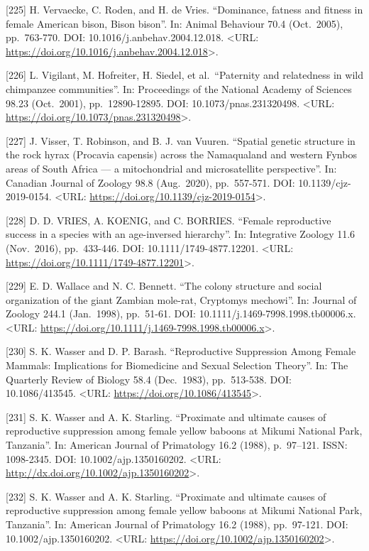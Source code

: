 \documentclass[
]{article}
\begin{document}
{[}225{]} H. Vervaecke, C. Roden, and H. de Vries. ``Dominance, fatness
and fitness in female American bison, Bison bison''. In: Animal
Behaviour 70.4 (Oct.~2005), pp.~763-770. DOI:
10.1016/j.anbehav.2004.12.018. \textless URL:
\url{https://doi.org/10.1016/j.anbehav.2004.12.018}\textgreater.

{[}226{]} L. Vigilant, M. Hofreiter, H. Siedel, et al.~``Paternity and
relatedness in wild chimpanzee communities''. In: Proceedings of the
National Academy of Sciences 98.23 (Oct.~2001), pp.~12890-12895. DOI:
10.1073/pnas.231320498. \textless URL:
\url{https://doi.org/10.1073/pnas.231320498}\textgreater.

{[}227{]} J. Visser, T. Robinson, and B. J. van Vuuren. ``Spatial
genetic structure in the rock hyrax (Procavia capensis) across the
Namaqualand and western Fynbos areas of South Africa --- a mitochondrial
and microsatellite perspective''. In: Canadian Journal of Zoology 98.8
(Aug.~2020), pp.~557-571. DOI: 10.1139/cjz-2019-0154. \textless URL:
\url{https://doi.org/10.1139/cjz-2019-0154}\textgreater.

{[}228{]} D. D. VRIES, A. KOENIG, and C. BORRIES. ``Female reproductive
success in a species with an age-inversed hierarchy''. In: Integrative
Zoology 11.6 (Nov.~2016), pp.~433-446. DOI: 10.1111/1749-4877.12201.
\textless URL:
\url{https://doi.org/10.1111/1749-4877.12201}\textgreater.

{[}229{]} E. D. Wallace and N. C. Bennett. ``The colony structure and
social organization of the giant Zambian mole-rat, Cryptomys mechowi''.
In: Journal of Zoology 244.1 (Jan.~1998), pp.~51-61. DOI:
10.1111/j.1469-7998.1998.tb00006.x. \textless URL:
\url{https://doi.org/10.1111/j.1469-7998.1998.tb00006.x}\textgreater.

{[}230{]} S. K. Wasser and D. P. Barash. ``Reproductive Suppression
Among Female Mammals: Implications for Biomedicine and Sexual Selection
Theory''. In: The Quarterly Review of Biology 58.4 (Dec.~1983),
pp.~513-538. DOI: 10.1086/413545. \textless URL:
\url{https://doi.org/10.1086/413545}\textgreater.

{[}231{]} S. K. Wasser and A. K. Starling. ``Proximate and ultimate
causes of reproductive suppression among female yellow baboons at Mikumi
National Park, Tanzania''. In: American Journal of Primatology 16.2
(1988), p.~97--121. ISSN: 1098-2345. DOI: 10.1002/ajp.1350160202.
\textless URL:
\url{http://dx.doi.org/10.1002/ajp.1350160202}\textgreater.

{[}232{]} S. K. Wasser and A. K. Starling. ``Proximate and ultimate
causes of reproductive suppression among female yellow baboons at Mikumi
National Park, Tanzania''. In: American Journal of Primatology 16.2
(1988), pp.~97-121. DOI: 10.1002/ajp.1350160202. \textless URL:
\url{https://doi.org/10.1002/ajp.1350160202}\textgreater.
\end{document}
